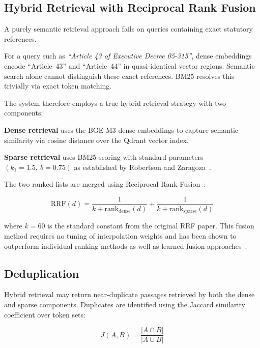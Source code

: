 \documentclass[12pt, a4paper]{article}
\begin{document}
\subsection{Hybrid Retrieval with Reciprocal Rank Fusion}

A purely semantic retrieval approach fails on queries containing exact statutory
references.

\begin{failurebox}
For a query such as \textit{``Article 43 of Executive Decree 05-315''}, dense embeddings
encode ``Article~43'' and ``Article~44'' in quasi-identical vector regions. Semantic
search alone cannot distinguish these exact references. BM25 resolves this trivially
via exact token matching.
\end{failurebox}

The system therefore employs a true hybrid retrieval strategy with two components:

\textbf{Dense retrieval} uses the BGE-M3 dense embeddings to capture semantic
similarity via cosine distance over the Qdrant vector index.

\textbf{Sparse retrieval} uses BM25 scoring with standard parameters
$(k_1 = 1.5,\ b = 0.75)$ as established by Robertson and Zaragoza~\cite{robertson2009bm25}.

The two ranked lists are merged using Reciprocal Rank Fusion~\cite{cormack2009rrf}:

\begin{equation}
  \mathrm{RRF}(d) = \frac{1}{k + \mathrm{rank}_{\mathrm{dense}}(d)}
                  + \frac{1}{k + \mathrm{rank}_{\mathrm{sparse}}(d)}
  \label{eq:rrf}
\end{equation}

where $k = 60$ is the standard constant from the original RRF paper. This fusion
method requires no tuning of interpolation weights and has been shown to outperform
individual ranking methods as well as learned fusion approaches~\cite{cormack2009rrf}.

\subsection{Deduplication}

Hybrid retrieval may return near-duplicate passages retrieved by both the dense
and sparse components. Duplicates are identified using the Jaccard similarity
coefficient over token sets:

\begin{equation}
  J(A, B) = \frac{|A \cap B|}{|A \cup B|}
  \label{eq:jaccard}
\end{equation}
\end{document}
